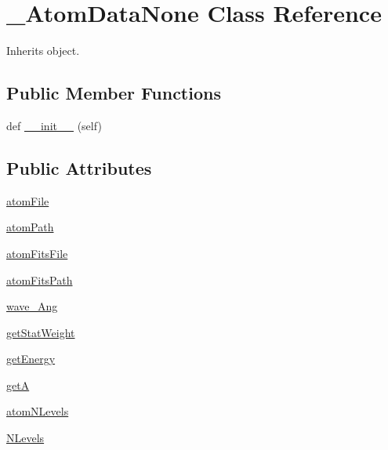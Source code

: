 \hypertarget{classpyneb_1_1core_1_1pynebcore_1_1___atom_data_none}{}\section{\+\_\+\+Atom\+Data\+None Class Reference}
\label{classpyneb_1_1core_1_1pynebcore_1_1___atom_data_none}


Inherits object.

\subsection*{Public Member Functions}
\begin{DoxyCompactItemize}
\item 
def \hyperlink{classpyneb_1_1core_1_1pynebcore_1_1___atom_data_none_ae64f0875afe3067b97ba370b354b9213}{\+\_\+\+\_\+init\+\_\+\+\_\+} (self)
\end{DoxyCompactItemize}
\subsection*{Public Attributes}
\begin{DoxyCompactItemize}
\item 
\hyperlink{classpyneb_1_1core_1_1pynebcore_1_1___atom_data_none_afa3c4660b3bcf1e2c199413048b9209e}{atom\+File}
\item 
\hyperlink{classpyneb_1_1core_1_1pynebcore_1_1___atom_data_none_a18178a28ecf0c7f251d0974c2097b214}{atom\+Path}
\item 
\hyperlink{classpyneb_1_1core_1_1pynebcore_1_1___atom_data_none_a80c24f287a25f67b489b472164691ea6}{atom\+Fits\+File}
\item 
\hyperlink{classpyneb_1_1core_1_1pynebcore_1_1___atom_data_none_a8d37532338fe8cf09d17000a7ae46d53}{atom\+Fits\+Path}
\item 
\hyperlink{classpyneb_1_1core_1_1pynebcore_1_1___atom_data_none_ab5130f33e76a12670614a4ecf47211b0}{wave\+\_\+\+Ang}
\item 
\hyperlink{classpyneb_1_1core_1_1pynebcore_1_1___atom_data_none_a76da9219880b92ab31bfbff268b9ddc9}{get\+Stat\+Weight}
\item 
\hyperlink{classpyneb_1_1core_1_1pynebcore_1_1___atom_data_none_a25f8bf6829f1707a2e51c73ed35c8301}{get\+Energy}
\item 
\hyperlink{classpyneb_1_1core_1_1pynebcore_1_1___atom_data_none_a8833ed6e4343a554784ea8642762d3dd}{get\+A}
\item 
\hyperlink{classpyneb_1_1core_1_1pynebcore_1_1___atom_data_none_ae9ca7d9b8e6463826cd148ff606cbc1c}{atom\+N\+Levels}
\item 
\hyperlink{classpyneb_1_1core_1_1pynebcore_1_1___atom_data_none_a4d45fe163c2108853ab418386bf4da56}{N\+Levels}
\end{DoxyCompactItemize}


